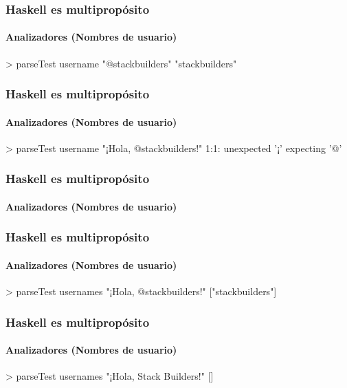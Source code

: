 \documentclass[spanish]{beamer}
\begin{document}

\begin{frame}[fragile]
  \frametitle{Haskell es multipropósito}
  \framesubtitle{Analizadores (Nombres de usuario)}

  \begin{code}
> parseTest username "@stackbuilders"
"stackbuilders"
  \end{code}
\end{frame}


\begin{frame}[fragile]
  \frametitle{Haskell es multipropósito}
  \framesubtitle{Analizadores (Nombres de usuario)}

  \begin{code}
> parseTest username "¡Hola, @stackbuilders!"
1:1:
unexpected '¡'
expecting '@'
  \end{code}
\end{frame}


\begin{frame}[fragile]
  \frametitle{Haskell es multipropósito}
  \framesubtitle{Analizadores (Nombres de usuario)}

\end{frame}


\begin{frame}[fragile]
  \frametitle{Haskell es multipropósito}
  \framesubtitle{Analizadores (Nombres de usuario)}

  \begin{code}
> parseTest usernames "¡Hola, @stackbuilders!"
["stackbuilders"]
  \end{code}
\end{frame}


\begin{frame}[fragile]
  \frametitle{Haskell es multipropósito}
  \framesubtitle{Analizadores (Nombres de usuario)}

  \begin{code}
> parseTest usernames "¡Hola, Stack Builders!"
[]
  \end{code}
\end{frame}
\end{document}

